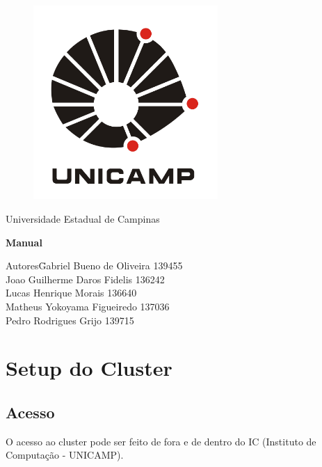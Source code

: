 \documentclass[a4paper,10pt]{article}
\date{\today}
\begin{document}
    \begin{titlepage}
        \begin{figure}
            \centering
          \includegraphics[width=7cm,keepaspectratio=true]{imagens/unicamp.png}

        \end{figure}
        \begin{center}
            \huge{Universidade Estadual de Campinas}

        \vfill
        \textbf{\LARGE{Manual}}
        \vfill
        \end{center}

        \begin{flushleft}
            \begin{tabbing}
                Autores\qquad\qquad\= Gabriel Bueno de Oliveira 139455 \\
                    \>Joao Guilherme Daros Fidelis 136242 \\
                    \>Lucas Henrique Morais 136640 \\
                    \>Matheus Yokoyama Figueiredo 137036\\
                    \>Pedro Rodrigues Grijo 139715\\
            \end{tabbing}
        \end{flushleft}
    \end{titlepage}

\newpage
\section{Setup do Cluster}
    \subsection{Acesso}
    O acesso ao cluster pode ser feito de fora e de dentro do IC (Instituto de Computação - UNICAMP).
\end{document}

